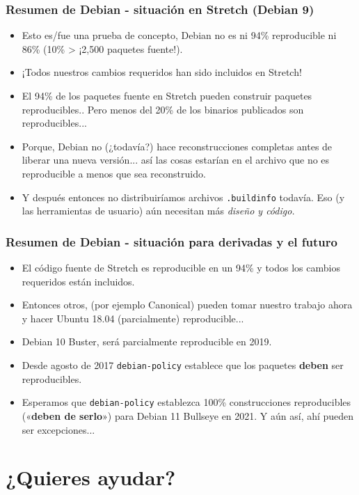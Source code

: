 \documentclass[14pt,aspectratio=169]{beamer}
\begin{document}
\begin{frame}
	\frametitle{Resumen de Debian - situación en Stretch (Debian 9)}
 \begin{itemize}
  \item Esto es/fue una prueba de concepto, Debian no es ni 94\% reproducible ni
  86\% (10\% > ¡2,500 paquetes fuente!).
  \item<2-4> ¡Todos nuestros cambios requeridos han sido incluidos en Stretch!
  \item<3-4> El 94\% de los paquetes fuente en Stretch pueden construir paquetes reproducibles.. Pero menos del 20\% de los binarios publicados son reproducibles...
  \item<3-4> Porque, Debian no (¿todavía?) hace reconstrucciones completas antes de
   liberar una nueva versión... así las cosas estarían en el archivo que no es reproducible a menos que sea
   reconstruido.
  \item<4> Y después entonces no distribuiríamos archivos \texttt{.buildinfo} todavía.
   Eso (y las herramientas de usuario) aún necesitan más \it{diseño} y código.
 \end{itemize}
\end{frame}

\begin{frame}
	\frametitle{Resumen de Debian - situación para derivadas y el futuro}
 \begin{itemize}
  \item El código fuente de Stretch es reproducible en un 94\% y todos los cambios requeridos están incluidos.
  \item Entonces otros, (por ejemplo Canonical) pueden tomar nuestro trabajo ahora y hacer Ubuntu 18.04
  (parcialmente) reproducible...
  \item<2-4> Debian 10 Buster, será parcialmente reproducible en 2019.
  \item<3-4> Desde agosto de 2017 \texttt{debian-policy} establece que los paquetes \textbf{deben} ser reproducibles.
  \item<4> Esperamos que \texttt{debian-policy} establezca 100\%
	  construcciones reproducibles («\textbf{deben de serlo}») para Debian 11 Bullseye en 2021. Y aún así, ahí pueden ser excepciones...
 \end{itemize}
\end{frame}

\section{¿Quieres ayudar?}
\end{document}
